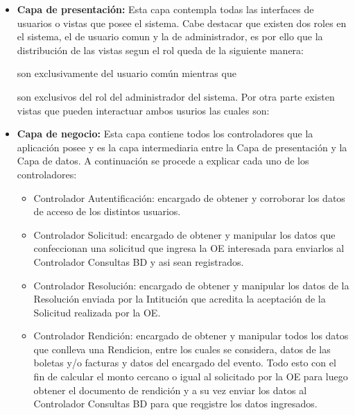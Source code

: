 \begin{itemize}
    \item \textbf{Capa de presentación: } Esta capa contempla todas las interfaces de usuarios o vistas que posee el sistema. Cabe destacar que existen dos roles en el sistema, el de usuario comun y la de administrador, es por ello que la distribución de las vistas segun el rol queda de la siguiente manera:
      son exclusivamente del usuario común mientras que 
      son exclusivos del rol del administrador del sistema. Por otra parte existen vistas que pueden interactuar ambos usurios las cuales son: 
    \item \textbf{Capa de negocio: }Esta capa contiene todos los controladores que la aplicación posee y es la capa intermediaria entre la Capa de presentación y la Capa de datos. A continuación se procede a explicar cada uno de los controladores:
        \begin{itemize}
            \item Controlador Autentificación: encargado de obtener y corroborar los datos de acceso de los distintos usuarios.
            \item Controlador Solicitud: encargado de obtener y manipular los datos que confeccionan una solicitud que ingresa la OE interesada para enviarlos al Controlador Consultas BD y asi sean registrados.
            \item Controlador Resolución: encargado de obtener y manipular los datos de la Resolución enviada por la Intitución que acredita la aceptación de la Solicitud realizada por la OE.
            \item Controlador Rendición: encargado de obtener y manipular todos los datos que conlleva una Rendicion, entre los cuales se considera, datos de las boletas y/o facturas y datos del encargado del evento. Todo esto con el fin de calcular el monto cercano o igual al solicitado por la OE para luego obtener el documento de rendición y a su vez enviar los datos al Controlador Consultas BD para que reqgistre los datos ingresados.

\end{itemize}
\end{itemize}
